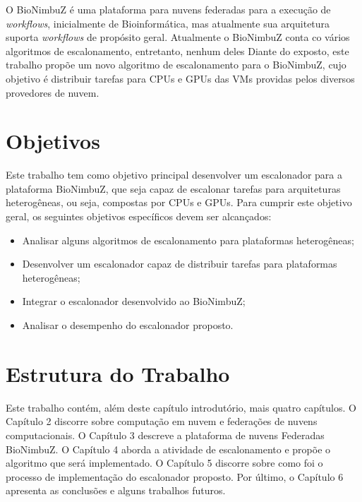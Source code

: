 O BioNimbuZ é uma plataforma para nuvens federadas para a execução de \textit{workflows}, inicialmente de Bioinformática, mas atualmente sua arquitetura suporta \textit{workflows} de propósito geral. Atualmente o BioNimbuZ conta co vários algoritmos de escalonamento, entretanto, nenhum deles  Diante do exposto, este trabalho propõe um novo algoritmo de escalonamento para o BioNimbuZ, cujo objetivo é distribuir tarefas para \acrshort{CPU}s e \acrshort{GPU}s das \acrshort{VM}s providas pelos diversos provedores de nuvem.


\section{Objetivos}
Este trabalho tem como objetivo principal desenvolver um escalonador para a plataforma BioNimbuZ, que seja capaz de escalonar tarefas para arquiteturas heterogêneas, ou seja, compostas por \acrshort{CPU}s e \acrshort{GPU}s. Para cumprir este objetivo geral, os seguintes objetivos específicos devem ser alcançados: 

\begin{itemize}
	\item Analisar alguns algoritmos de escalonamento para plataformas heterogêneas;
	\item Desenvolver um escalonador capaz de distribuir tarefas para plataformas heterogêneas;
	\item Integrar o escalonador desenvolvido ao BioNimbuZ;
	\item Analisar o desempenho do escalonador proposto.
\end{itemize}

\section{Estrutura do Trabalho}
Este trabalho contém, além deste capítulo introdutório, mais quatro capítulos. O Capítulo 2 discorre sobre computação em nuvem e federações de nuvens computacionais. O Capítulo 3 descreve a plataforma de nuvens Federadas BioNimbuZ. O Capítulo 4 aborda a atividade de escalonamento e propõe o algoritmo que será implementado. O Capítulo 5 discorre sobre como foi o processo de implementação do escalonador proposto. Por último, o Capítulo 6 apresenta as conclusões e alguns trabalhos futuros.